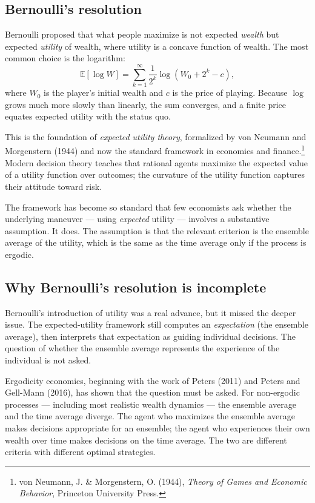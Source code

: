 \subsection{Bernoulli's resolution}

Bernoulli proposed that what people maximize is not expected
\emph{wealth} but expected \emph{utility} of wealth, where utility
is a concave function of wealth. The most common choice is the
logarithm:
\[
    \mathbb{E}[\log W] = \sum_{k=1}^\infty \frac{1}{2^k} \log(W_0 + 2^k - c),
\]
where $W_0$ is the player's initial wealth and $c$ is the price of
playing. Because $\log$ grows much more slowly than linearly, the
sum converges, and a finite price equates expected utility with the
status quo.

This is the foundation of \emph{expected utility theory}, formalized
by von Neumann and Morgenstern (1944) and now the standard framework
in economics and finance.\footnote{von Neumann, J. \& Morgenstern,
O. (1944), \emph{Theory of Games and Economic Behavior}, Princeton
University Press.} Modern decision theory teaches that rational
agents maximize the expected value of a utility function over
outcomes; the curvature of the utility function captures their
attitude toward risk.

The framework has become so standard that few economists ask whether
the underlying maneuver --- using \emph{expected} utility ---
involves a substantive assumption. It does. The assumption is that
the relevant criterion is the ensemble average of the utility, which
is the same as the time average only if the process is ergodic.

\subsection{Why Bernoulli's resolution is incomplete}

Bernoulli's introduction of utility was a real advance, but it
missed the deeper issue. The expected-utility framework still
computes an \emph{expectation} (the ensemble average), then
interprets that expectation as guiding individual decisions. The
question of whether the ensemble average represents the experience
of the individual is not asked.

Ergodicity economics, beginning with the work of Peters (2011) and
Peters and Gell-Mann (2016), has shown that the question must be
asked. For non-ergodic processes --- including most realistic
wealth dynamics --- the ensemble average and the time average
diverge. The agent who maximizes the ensemble average makes
decisions appropriate for an ensemble; the agent who experiences
their own wealth over time makes decisions on the time average. The
two are different criteria with different optimal strategies.

